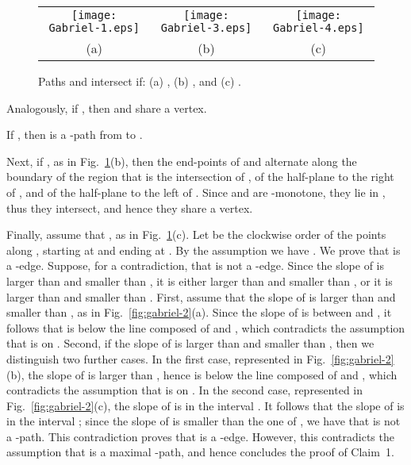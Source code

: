 \documentclass{llncs}
\renewenvironment{proof}
{{\bf Proof:}}{\hspace*{\fill}\par\vspace{2mm}}
\begin{document}
\begin{proof}
\begin{figure}[tb]
\begin{center}
\begin{tabular}{c c c}
\mbox{\texttt{[image: Gabriel-1.eps]}} & \hspace{5mm}
\mbox{\texttt{[image: Gabriel-3.eps]}} & \hspace{5mm}
\mbox{\texttt{[image: Gabriel-4.eps]}}\\
(a) \hspace{5mm} & \hspace{5mm} (b) & \hspace{5mm} (c)
\end{tabular}
\caption{Paths  and  intersect if: (a) , (b) , and (c) .}
\label{fig:gabriel}
\end{center}
\end{figure}


Analogously, if , then  and  share a vertex.

If , then  is a -path from  to .

Next, if , as in Fig.~\ref{fig:gabriel}(b), then the end-points of  and  alternate along the boundary of the region  that is the intersection of , of the half-plane to the right of , and of the half-plane to the left of . Since  and  are -monotone, they lie in , thus they intersect, and hence they share a vertex.

Finally, assume that , as in Fig.~\ref{fig:gabriel}(c). Let  be the clockwise order of the points along , starting at  and ending at . By the assumption  we have . We prove that  is a -edge. Suppose, for a contradiction, that  is not a -edge. Since the slope of  is larger than  and smaller than , it is either larger than  and smaller than , or it is larger than  and smaller than . First, assume that the slope of  is larger than  and smaller than , as in Fig.~\ref{fig:gabriel-2}(a). Since the slope of  is between  and , it follows that  is below the line composed of  and , which contradicts the assumption that  is on . Second, if the slope of  is larger than  and smaller than , then we distinguish two further cases. In the first case, represented in Fig.~\ref{fig:gabriel-2}(b), the slope of  is larger than , hence  is below the line composed of  and , which contradicts the assumption that  is on . In the second case, represented in Fig.~\ref{fig:gabriel-2}(c), the slope of  is in the interval . It follows that the slope of  is in the interval ; since the slope of  is smaller than the one of , we have that  is not a -path. This contradiction proves that  is a -edge. However, this contradicts the assumption that  is a maximal -path, and hence concludes the proof of Claim~1.


\end{proof}
\end{document}

